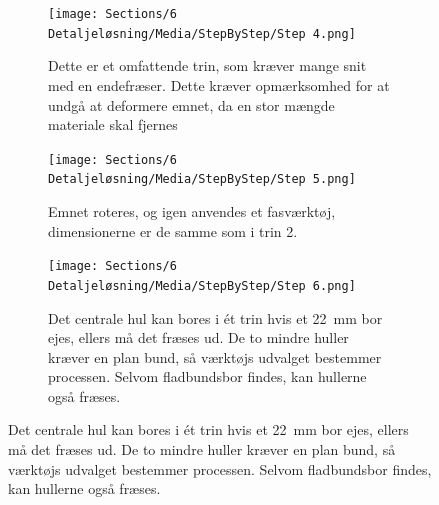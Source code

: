 \begin{figure}[H]
        \begin{subfigure}[t]{0.32\textwidth}
            \centering
            \texttt{[image: Sections/6 Detaljeløsning/Media/StepByStep/Step 4.png]}
            \caption{Dette er et omfattende trin, som kræver mange snit med en endefræser. Dette kræver opmærksomhed for at undgå at deformere emnet, da en stor mængde materiale skal fjernes}
            \label{fig:Step4}
        \end{subfigure}
        \hfill
        \begin{subfigure}[t]{0.32\textwidth}
            \centering
            \texttt{[image: Sections/6 Detaljeløsning/Media/StepByStep/Step 5.png]}
            \caption{Emnet roteres, og igen anvendes et fasværktøj, dimensionerne er de samme som i trin 2.}
            \label{fig:Step5}
        \end{subfigure}
        \hfill
        \begin{subfigure}[t]{0.32\textwidth}
            \centering
            \texttt{[image: Sections/6 Detaljeløsning/Media/StepByStep/Step 6.png]}
            \caption{Det centrale hul kan bores i ét trin hvis et \SI{22}{mm} bor ejes, ellers må det fræses ud. De to mindre huller kræver en plan bund, så værktøjs udvalget bestemmer processen. Selvom fladbundsbor findes, kan hullerne også fræses.}
            \label{fig:Step6}
        \end{subfigure}
    
    \vspace{1em}
    

\end{figure}
